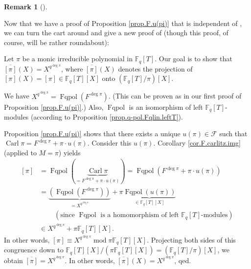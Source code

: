 \documentclass[numbers=enddot,12pt,final,onecolumn,notitlepage]{scrartcl}%
\theoremstyle{definition}
\newtheorem{remk}[theo]{Remark}
\newenvironment{remark}[1][]
{\begin{remk}[#1]\begin{leftbar}}
{\end{leftbar}\end{remk}}
\begin{document}
\begin{remark}
Now that we have a proof of Proposition \ref{prop.F.u(pi)} that is independent
of \cite[Theorem 2.11]{kc-carlitz}, we can turn the cart around and give a new
proof of \cite[Theorem 2.11, last equality]{kc-carlitz} (though this proof, of
course, will be rather roundabout):

Let $\pi$ be a monic irreducible polynomial in $\mathbb{F}_{q}\left[
T\right]  $. Our goal is to show that $\overline{\left[  \pi\right]  }\left(
X\right)  =X^{q^{\deg\pi}}$, where $\overline{\left[  \pi\right]  }\left(
X\right)  $ denotes the projection of $\left[  \pi\right]  \left(  X\right)
=\left[  \pi\right]  \in\mathbb{F}_{q}\left[  T\right]  \left[  X\right]  $
onto $\left(  \mathbb{F}_{q}\left[  T\right]  /\pi\right)  \left[  X\right]  $.

We have $X^{q^{\deg\pi}}=\operatorname*{Fqpol}\left(  F^{\deg\pi}\right)  $.
(This can be proven as in our first proof of Proposition \ref{prop.F.u(pi)}.)
Also, $\operatorname*{Fqpol}$ is an isomorphism of left $\mathbb{F}_{q}\left[
T\right]  $-modules (according to Proposition \ref{prop.q-pol.Fqlin.leftT}).

Proposition \ref{prop.F.u(pi)} shows that there exists a unique $u\left(
\pi\right)  \in\mathcal{F}$ such that $\operatorname*{Carl}\pi=F^{\deg\pi}%
+\pi\cdot u\left(  \pi\right)  $. Consider this $u\left(  \pi\right)  $.
Corollary \ref{cor.F.carlitz.img} (applied to $M=\pi$) yields
\begin{align*}
\left[  \pi\right]   &  =\operatorname*{Fqpol}\left(
\underbrace{\operatorname*{Carl}\pi}_{=F^{\deg\pi}+\pi\cdot u\left(
\pi\right)  }\right)  =\operatorname*{Fqpol}\left(  F^{\deg\pi}+\pi\cdot
u\left(  \pi\right)  \right) \\
&  =\underbrace{\left(  \operatorname*{Fqpol}\left(  F^{\deg\pi}\right)
\right)  }_{=X^{q^{\deg\pi}}}+\pi\underbrace{\operatorname*{Fqpol}\left(
u\left(  \pi\right)  \right)  }_{\in\mathbb{F}_{q}\left[  T\right]  \left[
X\right]  }\\
&  \ \ \ \ \ \ \ \ \ \ \left(  \text{since }\operatorname*{Fqpol}\text{ is a
homomorphism of left }\mathbb{F}_{q}\left[  T\right]  \text{-modules}\right)
\\
&  \in X^{q^{\deg\pi}}+\pi\mathbb{F}_{q}\left[  T\right]  \left[  X\right]  .
\end{align*}
In other words, $\left[  \pi\right]  \equiv X^{q^{\deg\pi}}\operatorname{mod}%
\pi\mathbb{F}_{q}\left[  T\right]  \left[  X\right]  $. Projecting both sides
of this congruence down to $\mathbb{F}_{q}\left[  T\right]  \left[  X\right]
/\left(  \pi\mathbb{F}_{q}\left[  T\right]  \left[  X\right]  \right)
=\left(  \mathbb{F}_{q}\left[  T\right]  /\pi\right)  \left[  X\right]  $, we
obtain $\overline{\left[  \pi\right]  }=X^{q^{\deg\pi}}$. In other words,
$\overline{\left[  \pi\right]  }\left(  X\right)  =X^{q^{\deg\pi}}$, qed.
\end{remark}
\end{document}
